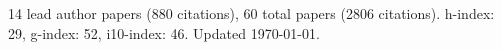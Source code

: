 14 lead author papers (880 citations),
60 total papers (2806 citations).\newline
h-index: 29, g-index: 52, i10-index: 46. Updated \today.